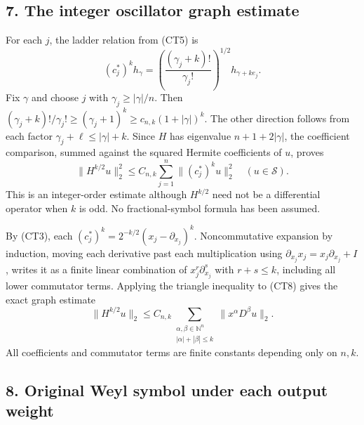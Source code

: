 \documentclass[
  11pt,
]{article}
\begin{document}
\subsection{7. The integer oscillator graph
estimate}\label{the-integer-oscillator-graph-estimate}

For each \(j\), the ladder relation from (CT5) is \[
 (c_j^*)^k h_\gamma
 =\left(\frac{(\gamma_j+k)!}{\gamma_j!}\right)^{1/2}
          h_{\gamma+ke_j}.
 \tag{CT7}
\] Fix \(\gamma\) and choose \(j\) with \(\gamma_j\ge|\gamma|/n\). Then
\((\gamma_j+k)!/\gamma_j!\ge(\gamma_j+1)^k
\ge c_{n,k}(1+|\gamma|)^k\). The other direction follows from each
factor \(\gamma_j+\ell\le|\gamma|+k\). Since \(H\) has eigenvalue
\(n+1+2|\gamma|\), the coefficient comparison, summed against the
squared Hermite coefficients of \(u\), proves \[
 \|H^{k/2}u\|_2^2
 \le C_{n,k}\sum_{j=1}^n\|(c_j^*)^k u\|_2^2
 \quad (u\in\mathcal S).
 \tag{CT8}
\] This is an integer-order estimate although \(H^{k/2}\) need not be a
differential operator when \(k\) is odd. No fractional-symbol formula
has been assumed.

By (CT3), each \((c_j^*)^k=2^{-k/2}(x_j-\partial_{x_j})^k\).
Noncommutative expansion by induction, moving each derivative past each
multiplication using \(\partial_{x_j}x_j=x_j\partial_{x_j}+I\), writes
it as a finite linear combination of \(x_j^r\partial_{x_j}^s\) with
\(r+s\le k\), including all lower commutator terms. Applying the
triangle inequality to (CT8) gives the exact graph estimate \[
 \|H^{k/2}u\|_2
 \le C_{n,k}\sum_{\substack{\alpha,\beta\in\mathbb N^n\\
                         |\alpha|+|\beta|\le k}}
          \|x^\alpha D^\beta u\|_2 .
 \tag{CT9}
\] All coefficients and commutator terms are finite constants depending
only on \(n,k\).

\subsection{8. Original Weyl symbol under each output
weight}\label{original-weyl-symbol-under-each-output-weight}
\end{document}
